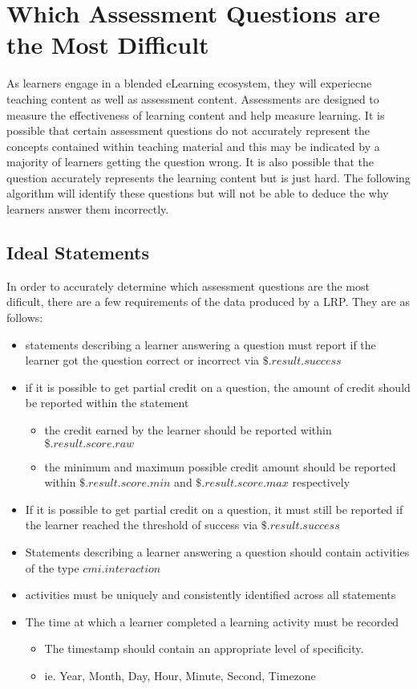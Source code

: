 \documentclass{article}
\begin{document}
\section{Which Assessment Questions are the Most Difficult}
As learners engage in a blended eLearning ecosystem, they will
experiecne teaching content as well as assessment content. Assessments
are designed to measure the effectiveness of learning content and help
measure learning. It is possible that certain assessment questions
do not accurately represent the concepts contained within teaching
material and this may be indicated by a majority of learners getting
the question wrong. It is also possible that the question accurately
represents the learning content but is just hard. The following
algorithm will identify these questions but will not be able to deduce
the why learners answer them incorrectly.

\subsection{Ideal Statements}
In order to accurately determine which assessment questions are the
most dificult, there are a few requirements of the data produced by a
LRP. They are as follows:
\begin{itemize}
\item statements describing a learner answering a question must report
  if the learner got the question correct or incorrect via $\$.result.success$
\item if it is possible to get partial credit on a question, the amount
  of credit should be reported within the statement
  \begin{itemize}
  \item the credit earned by the learner should be reported within $\$.result.score.raw$
  \item the minimum and maximum possible credit amount should be
    reported within $\$.result.score.min$ and $\$.result.score.max$
    respectively
  \end{itemize}
\item If it is possible to get partial credit on a question, it must
  still be reported if the learner reached the threshold of success
  via $\$.result.success$
\item Statements describing a learner answering a question should
  contain activities of the type $cmi.interaction$
\item activities must be uniquely and consistently identified across all statements
\item The time at which a learner completed a learning activity must be recorded
  \begin{itemize}
  \item The timestamp should contain an appropriate level of specificity.
  \item ie. Year, Month, Day, Hour, Minute, Second, Timezone
  \end{itemize}
\end{itemize}
\end{document}
